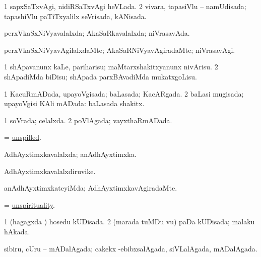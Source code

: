 \bentry
{} 
\gl{\gu}
\expl{}
\bmng
\bnum
\num{1} sapxSaTxvAgi, nidiRSaTxvAgi heVLada. 
\num{2} vivara, tapasiVlu -- namUdisada; tapashiVlu paTiTxyalilx seVrisada, kANisada. 
\enum
\emng
\eentry

\bentry
{} 
\gl{\gu}
\expl{}
\bmng
perxVkaSxNiVyavalalxda; AkaSaRkavalalxda; niVrasavAda. 
\emng
\eentry

\bentry
{} 
\gl{\kirxvi}
\expl{}
\bmng
perxVkaSxNiVyavAgilalxdaMte; AkaSaRNiVyavAgiradaMte; niVrasavAgi. 
\emng
\eentry

\bentry
{} 
\gl{\sakirx}
\expl{}
\bmng
\bnum
\num{1} shApavanunx kaLe, pariharisu; maMtarxshakitxyanunx nivArisu. 
\num{2} shApadiMda biDisu; shApada parxBAvadiMda mukatxgoLisu. 
\enum
\emng
\eentry

\bentry
{} 
\gl{\gu}
\expl{}
\bmng
\bnum
\num{1} KacuRmADada, upayoVgisada; baLasada; KacARgada. 
\num{2} baLasi mugisada; upayoVgisi KAli mADada:  baLasada shakitx. 
\enum
\emng
\eentry

\bentry
{} 
\gl{\gu}
\expl{}
\bmng
\bnum
\num{1} soVrada; celalxda. 
\num{2} poVlAgada; vayxthaRmADada. 
\enum
\emng
\eentry

\bentry
{} 
\gl{\gu}
\expl{}
\bmng
= \hyperlink{unspilled}{unspilled}. 
\emng
\eentry

\bentry
{} 
\gl{\gu}
\expl{}
\bmng
AdhAyxtimxkavalalxda; anAdhAyxtimxka. 
\emng
\eentry

\bentry
{} 
\gl{\nA}
\expl{}
\bmng
AdhAyxtimxkavalalxdiruvike. 
\emng
\eentry

\bentry
{} 
\gl{\kirxvi}
\expl{}
\bmng
anAdhAyxtimxkateyiMda; AdhAyxtimxkavAgiradaMte. 
\emng
\eentry

\bentry
{} 
\gl{\nA}
\expl{}
\bmng
= \hyperlink{unspirituality}{unspirituality}. 
\emng
\eentry

\bentry
{} 
\gl{\gu}
\expl{}
\bmng
\bnum
\num{1} (hagagxda \vi) hosedu kUDisada. 
\num{2} (marada tuMDu \mo vu) paDa kUDisada; malaku hAkada. 
\enum
\emng
\eentry

\bentry
{} 
\gl{\gu}
\expl{}
\bmng
sibiru, cUru -- mADalAgada; cakekx -ebibxsalAgada, siVLalAgada, mADalAgada. 
\emng
\eentry

